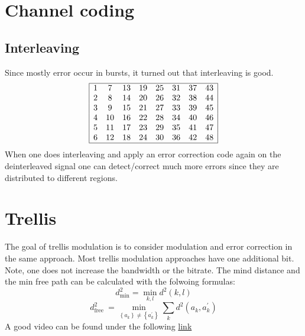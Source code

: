 \section{Channel coding}
\subsection{Interleaving}
Since mostly error occur in bursts, it turned out that interleaving is good.
$$
\begin{array}{|cccccccc|}
\hline 1 & 7 & 13 & 19 & 25 & 31 & 37 & 43 \\
2 & 8 & 14 & 20 & 26 & 32 & 38 & 44 \\
3 & 9 & 15 & 21 & 27 & 33 & 39 & 45 \\
4 & 10 & 16 & 22 & 28 & 34 & 40 & 46 \\
5 & 11 & 17 & 23 & 29 & 35 & 41 & 47 \\
6 & 12 & 18 & 24 & 30 & 36 & 42 & 48 \\
\hline
\end{array}
$$
When one does interleaving and apply an error correction code again on the deinterleaved signal one can detect/correct much more errors since they are distributed to different regions.
\section{Trellis}
The goal of trellis modulation is to consider modulation and error correction in the same approach. Most trellis modulation approaches have one additional bit. Note, one does not increase the bandwidth or the bitrate. The mind distance and the min free path can be calculated with the folwoing formulas:
\begin{equation}
d_{\min }^2=\min _{k, l} d^2(k, l)
\end{equation}
\begin{equation}
d_{\text {free }}^2=\min _{\left\{a_k\right\} \neq\left\{a_k^{\prime}\right\}} \sum_k d^2\left(a_k, a_k^{\prime}\right)
\end{equation}
A good video can be found under the following \href{https://youtu.be/BcxmAph_DsE}{link}
